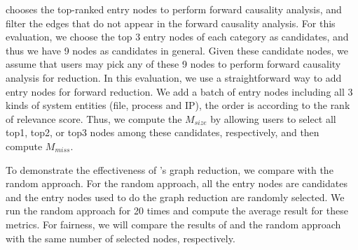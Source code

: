{\tool chooses the top-ranked entry nodes to perform forward causality analysis, and filter the edges that do not appear in the forward causality analysis. 
For this evaluation, we choose the top 3 entry nodes of each category as candidates, and thus we have 9 nodes as candidates in general. 
Given these candidate nodes, we assume that users may pick any of these 9 nodes to perform forward causality analysis for reduction. 
In this evaluation, we use a straightforward way to add entry nodes for forward reduction. 
We add a batch of entry nodes including all 3 kinds of system entities (\ie file, process and IP), the order is according to the rank of relevance score.
Thus, we compute the $M_{size}$ by allowing users to select all top1, top2, or top3 nodes among these candidates, respectively, and then compute $M_{miss}$.


To demonstrate the effectiveness of \tool's graph reduction, we compare \tool with the random  approach. 
For the random approach, all the entry nodes are candidates and the entry nodes used to do the graph reduction are randomly selected. 
We run the random approach for 20 times and compute the average result for these metrics.
For fairness, we will compare the results of \tool and the random approach with the same number of selected nodes, respectively.
}

